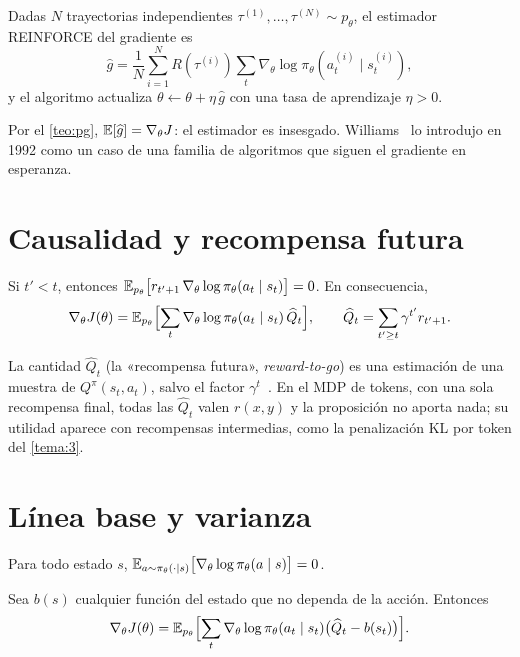 \begin{definicion}\label{def:reinforce}
Dadas $N$ trayectorias independientes $\tau^{(1)},\dots,\tau^{(N)}\sim p_\theta$, el estimador REINFORCE del gradiente es
\[
\widehat{g}=\frac1N\sum_{i=1}^{N}R(\tau^{(i)})\sum_{t}\nabla_\theta\log\pi_\theta(a^{(i)}_t\mid s^{(i)}_t),
\]
y el algoritmo actualiza $\theta\leftarrow\theta+\eta\,\widehat{g}$ con una tasa de aprendizaje $\eta>0$.
\end{definicion}

Por el \cref{teo:pg}, $\mathbb{E}[\widehat g]=\nabla_\theta J$: el estimador es insesgado. Williams~\cite{williams} lo introdujo en 1992 como un caso de una familia de algoritmos que siguen el gradiente en esperanza.

\addtocounter{definicion}{1}%

\section{Causalidad y recompensa futura}

\begin{proposicion}\label{prop:causalidad}
Si $t'<t$, entonces $\mathbb{E}_{p_\theta}\bigl[r_{t'+1}\,\nabla_\theta\log\pi_\theta(a_t\mid s_t)\bigr]=0$. En consecuencia,
\[
\nabla_\theta J(\theta)=\mathbb{E}_{p_\theta}\Bigl[\sum_{t}\nabla_\theta\log\pi_\theta(a_t\mid s_t)\,\widehat{Q}_t\Bigr],\qquad \widehat Q_t=\sum_{t'\ge t}\gamma^{t'}r_{t'+1}.
\]
\end{proposicion}

La cantidad $\widehat Q_t$ (la «recompensa futura», \emph{reward-to-go}) es una estimación de una muestra de $Q^{\pi}(s_t,a_t)$, salvo el factor $\gamma^{t}$~\cite{cs285hw2}. En el MDP de tokens, con una sola recompensa final, todas las $\widehat Q_t$ valen $r(x,y)$ y la proposición no aporta nada; su utilidad aparece con recompensas intermedias, como la penalización KL por token del \cref{tema:3}.

\section{Línea base y varianza}

\begin{lema}\label{lem:score-media}
Para todo estado $s$, $\mathbb{E}_{a\sim\pi_\theta(\cdot\mid s)}\bigl[\nabla_\theta\log\pi_\theta(a\mid s)\bigr]=0$.
\end{lema}

\begin{proposicion}\label{prop:baseline}
Sea $b(s)$ cualquier función del estado que no dependa de la acción. Entonces
\[
\nabla_\theta J(\theta)=\mathbb{E}_{p_\theta}\Bigl[\sum_t\nabla_\theta\log\pi_\theta(a_t\mid s_t)\bigl(\widehat Q_t-b(s_t)\bigr)\Bigr].
\]
\end{proposicion}

